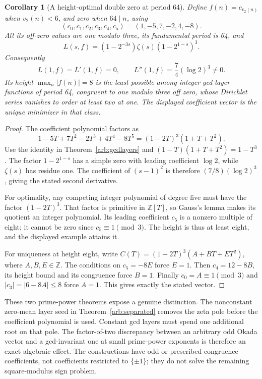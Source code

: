 \documentclass[11pt,a4paper]{article}
\newtheorem{corollary}[theorem]{Corollary}
\theoremstyle{definition}
\theoremstyle{remark}
\numberwithin{equation}{section}
\begin{document}
\begin{corollary}[A height-optimal double zero at period 64]
\label{arb:64-optimal}
Define \(f(n)=c_{v_2(n)}\) when \(v_2(n)<6\), and zero when
\(64\mid n\), using
\[
 (c_0,c_1,c_2,c_3,c_4,c_5)=(1,-5,7,-2,4,-8).
\]
All its off-zero values are one modulo three, its fundamental period
is 64, and
\[
 L(s,f)=(1-2^{-3s})\zeta(s)(1-2^{1-s})^3.
\]
Consequently
\[
 L(1,f)=L'(1,f)=0,\qquad
 L''(1,f)=\frac74(\log2)^3\ne0.
\]
Its height \(\max_n|f(n)|=8\) is the least possible among integer
gcd-layer functions of period 64, congruent to one modulo three
off zero, whose Dirichlet series vanishes to order at least two
at one. The displayed coefficient vector is the unique minimizer in
that class.
\end{corollary}

\begin{proof}
The coefficient polynomial factors as
\[
 1-5T+7T^2-2T^3+4T^4-8T^5
     =(1-2T)^3(1+T+T^2).
\]
Use the identity in Theorem~\ref{arb:gcdlayers} and
\((1-T)(1+T+T^2)=1-T^3\).
The factor \(1-2^{1-s}\) has a simple zero with leading
coefficient \(\log2\), while \(\zeta(s)\) has residue one.
The coefficient of \((s-1)^2\) is therefore
\((7/8)(\log2)^3\), giving the stated second derivative.

For optimality, any competing integer polynomial of degree five
must have the factor \((1-2T)^3\).
That factor is primitive in \(\mathbb Z[T]\), so Gauss's lemma
makes its quotient an integer polynomial.  Its leading coefficient
\(c_5\) is a nonzero multiple of eight; it cannot be zero since
\(c_5\equiv1\pmod3\).  The height is thus at least eight,
and the displayed example attains it.

For uniqueness at height eight, write
\(C(T)=(1-2T)^3(A+BT+ET^2)\), where \(A,B,E\in\mathbb Z\).
The conditions on \(c_5=-8E\) force \(E=1\).
Then \(c_4=12-8B\), its height bound and its congruence force \(B=1\).
Finally \(c_0=A\equiv1\pmod3\) and \(|c_3|=|6-8A|\le8\)
force \(A=1\). This gives exactly the stated vector.
\end{proof}

These two prime-power theorems expose a genuine distinction.
The nonconstant zero-mean layer seed in
Theorem~\ref{arb:separated} removes the zeta pole before the
coefficient polynomial is used.  Constant gcd layers must spend
one additional root on that pole.  The factor-of-two discrepancy
between an arbitrary odd Okada vector and a gcd-invariant one at
small prime-power exponents is therefore an exact algebraic effect.
The constructions have odd or prescribed-congruence coefficients,
not coefficients restricted to \(\{\pm1\}\); they do not solve
the remaining square-modulus sign problem.
\end{document}
